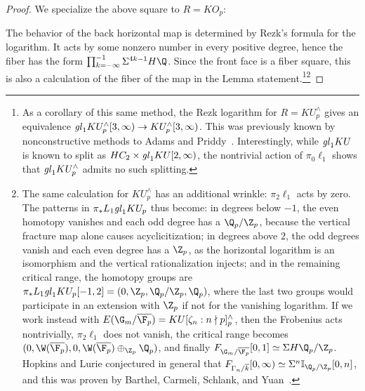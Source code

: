 \begin{proof}
We specialize the above square to \(R = KO_p\):
\begin{center}
\end{center}
The behavior of the back horizontal map is determined by Rezk's formula for the logarithm.  It acts by some nonzero number in every positive degree, hence the fiber has the form \(\prod_{k=-\infty}^{-1} \Susp^{4k-1} H\Q\).  Since the front face is a fiber square, this is also a calculation of the fiber of the map in the Lemma statement.\footnote{As a corollary of this same method, the Rezk logarithm for \(R = KU^\wedge_p\) gives an equivalence \(\mathit{gl}_1 KU^\wedge_p[3, \infty) \to KU^\wedge_p[3, \infty)\).  This was previously known by nonconstructive methods to Adams and Priddy~\cite[Corollary 1.4]{AdamsPriddy}.  Interestingly, while \(\mathit{gl}_1 KU\) is known to split as \(HC_2 \times \mathit{gl}_1 KU[2, \infty)\), the nontrivial action of \(\pi_0 \ell_1\) shows that \(\mathit{gl}_1 KU^\wedge_p\) admits no such splitting.}\footnote{The same calculation for \(KU^\wedge_p\) has an additional wrinkle: \(\pi_2 \ell_1\) acts by zero.  The patterns in \(\pi_* L_1 \mathit{gl}_1 KU_p\) thus become: in degrees below \(-1\), the even homotopy vanishes and each odd degree has a \(\Q_p / \Z_p\), because the vertical fracture map alone causes acyclicitization; in degrees above \(2\), the odd degrees vanish and each even degree has a \(\Z_p\), as the horizontal logarithm is an isomorphism and the vertical rationalization injects; and in the remaining critical range, the homotopy groups are \(\pi_* L_1 \gl_1 KU_p[-1, 2] = (0, \Z_p, \Q_p / \Z_p, \Q_p)\), where the last two groups would participate in an extension with \(\Z_p\) if not for the vanishing logarithm.  If we work instead with \(E(\G_m / \overline{\F_p}) = KU[\zeta_n : n \nmid p]^\wedge_p\), then the Frobenius acts nontrivially, \(\pi_2 \ell_1\) does not vanish, the critical range becomes \((0, \W(\overline{\F_p}), 0, \W(\overline{\F_p}) \oplus_{\Z_p} \Q_p)\), and finally \(F_{\G_m / \overline{\F_p}}[0, 1] \simeq \Susp H\Q_p/\Z_p\).  Hopkins and Lurie conjectured in general that \(F_{\Gamma_n / \overline{k}}[0, \infty) \simeq \Susp^n \mathbb I_{\Q_p/\Z_p}[0, n]\), and this was proven by Barthel, Carmeli, Schlank, and Yuan~\cite[Theorem E]{BCSY}.}
\end{proof}

